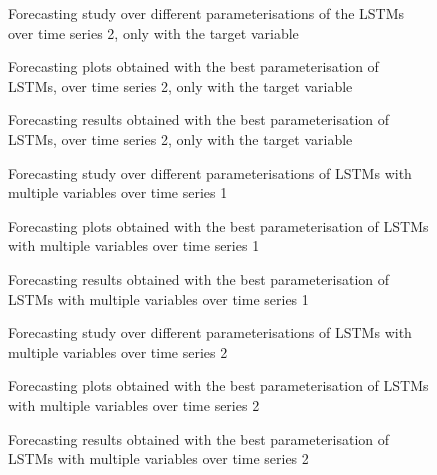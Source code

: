 \documentclass[10pt]{extarticle}
\begin{document}
\begin{figure}[H]
\caption{Forecasting study over different parameterisations of the LSTMs over time series 2, only with the target variable}
\end{figure}

\begin{figure}[H]
\caption{Forecasting plots obtained with the best parameterisation of LSTMs, over time series 2, only with the target variable}
\end{figure}

\begin{figure}[H]
\caption{Forecasting results obtained with the best parameterisation of LSTMs, over time series 2, only with the target variable}
\end{figure}

\begin{figure}[H]
\caption{Forecasting study over different parameterisations of LSTMs with multiple variables over time series 1}
\end{figure}

\begin{figure}[H]
\caption{Forecasting plots obtained with the best parameterisation of LSTMs with multiple variables over time series 1}
\end{figure}

\begin{figure}[H]
\caption{Forecasting results obtained with the best parameterisation of LSTMs with multiple variables over time series 1}
\end{figure}

\begin{figure}[H]
\caption{Forecasting study over different parameterisations of LSTMs with multiple variables over time series 2}
\end{figure}

\begin{figure}[H]
\caption{Forecasting plots obtained with the best parameterisation of LSTMs with multiple variables over time series 2}
\end{figure}

\begin{figure}[H]
\caption{Forecasting results obtained with the best parameterisation of LSTMs with multiple variables over time series 2}
\end{figure}
\end{document}
